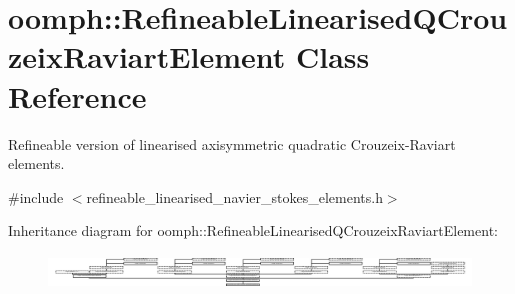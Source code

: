 \hypertarget{classoomph_1_1RefineableLinearisedQCrouzeixRaviartElement}{}\section{oomph\+:\+:Refineable\+Linearised\+Q\+Crouzeix\+Raviart\+Element Class Reference}
\label{classoomph_1_1RefineableLinearisedQCrouzeixRaviartElement}


Refineable version of linearised axisymmetric quadratic Crouzeix-\/\+Raviart elements.  




{\ttfamily \#include $<$refineable\+\_\+linearised\+\_\+navier\+\_\+stokes\+\_\+elements.\+h$>$}

Inheritance diagram for oomph\+:\+:Refineable\+Linearised\+Q\+Crouzeix\+Raviart\+Element\+:\begin{figure}[H]
\begin{center}
\leavevmode
\includegraphics[height=0.928030cm]{classoomph_1_1RefineableLinearisedQCrouzeixRaviartElement}
\end{center}
\end{figure}
